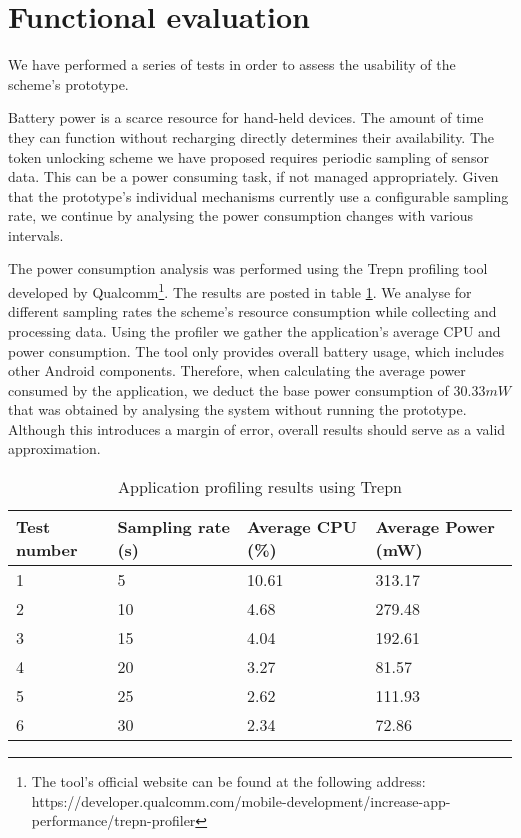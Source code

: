 \section{Functional evaluation}
\label{functionaleval}
We have performed a series of tests in order to assess the usability of the scheme's prototype. 

Battery power is a scarce resource for hand-held devices. The amount of time they can function without recharging directly determines their availability. The token unlocking scheme we have proposed requires periodic sampling of sensor data. This can be a power consuming task, if not managed appropriately. Given that the prototype's individual mechanisms currently use a configurable sampling rate, we continue by analysing the power consumption changes with various intervals.

The power consumption analysis was performed using the Trepn profiling tool developed by Qualcomm\footnote{The tool's official website can be found at the following address: https://developer.qualcomm.com/mobile-development/increase-app-performance/trepn-profiler}. The results are posted in table \ref{tab:powerprofile}. We analyse for different sampling rates the scheme's resource consumption while collecting and processing data. Using the profiler we gather the application's average CPU and power consumption. The tool only provides overall battery usage, which includes other Android components. Therefore, when calculating the average power consumed by the application, we deduct the base power consumption of $30.33 mW$ that was obtained by analysing the system without running the prototype. Although this introduces a margin of error, overall results should serve as a valid approximation.

\begin{table}
    \begin{tabular}{l|l|l|l}
    Test number & Sampling rate (s) & Average CPU (\%) & Average Power (mW) \\ \hline
    1           & 5                 & 10.61            & 313.17             \\
    2           & 10                & 4.68             & 279.48             \\
    3           & 15                & 4.04             & 192.61             \\
    4           & 20                & 3.27             & 81.57              \\
    5           & 25                & 2.62             & 111.93             \\
    6           & 30                & 2.34             & 72.86              \\
    \end{tabular}
	
	\caption{Application profiling results using Trepn}
	\label{tab:powerprofile}
\end{table}

